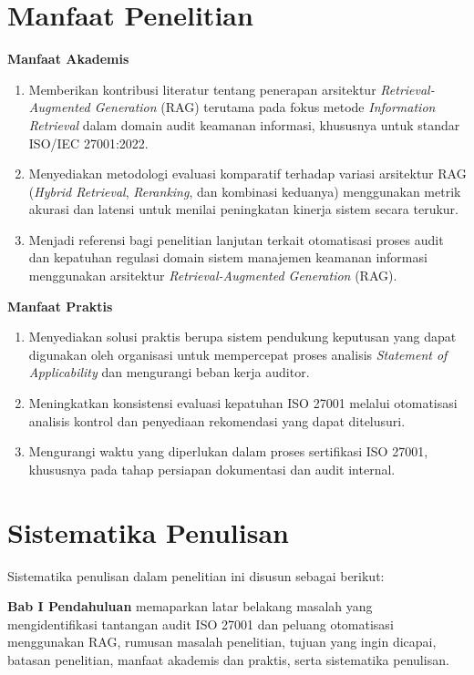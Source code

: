 \section{Manfaat Penelitian}

\noindent\textbf{Manfaat Akademis}
\begin{enumerate}
	\item Memberikan kontribusi literatur tentang penerapan arsitektur \textit{Retrieval-Augmented Generation} (RAG) terutama pada fokus metode \textit{Information Retrieval} dalam domain audit keamanan informasi, khususnya untuk standar ISO/IEC 27001:2022.
	\item Menyediakan metodologi evaluasi komparatif terhadap variasi arsitektur RAG (\textit{Hybrid Retrieval}, \textit{Reranking}, dan kombinasi keduanya) menggunakan metrik akurasi dan latensi untuk menilai peningkatan kinerja sistem secara terukur.
	\item Menjadi referensi bagi penelitian lanjutan terkait otomatisasi proses audit dan kepatuhan regulasi domain sistem manajemen keamanan informasi menggunakan arsitektur \textit{Retrieval-Augmented Generation} (RAG).
\end{enumerate}

\noindent\textbf{Manfaat Praktis}
\begin{enumerate}
	\item Menyediakan solusi praktis berupa sistem pendukung keputusan yang dapat digunakan oleh organisasi untuk mempercepat proses analisis \textit{Statement of Applicability} dan mengurangi beban kerja auditor.
	\item Meningkatkan konsistensi evaluasi kepatuhan ISO 27001 melalui otomatisasi analisis kontrol dan penyediaan rekomendasi yang dapat ditelusuri.
	\item Mengurangi waktu yang diperlukan dalam proses sertifikasi ISO 27001, khususnya pada tahap persiapan dokumentasi dan audit internal.
\end{enumerate}

\section{Sistematika Penulisan}
Sistematika penulisan dalam penelitian ini disusun sebagai berikut:

\noindent \textbf{Bab I Pendahuluan} memaparkan latar belakang masalah yang mengidentifikasi tantangan audit ISO 27001 dan peluang otomatisasi menggunakan RAG, rumusan masalah penelitian, tujuan yang ingin dicapai, batasan penelitian, manfaat akademis dan praktis, serta sistematika penulisan.

